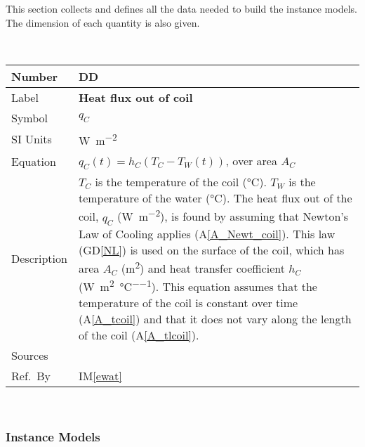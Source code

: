 \documentclass[12pt]{article}
\newcommand{\colAwidth}{0.13\textwidth}
\newcommand{\colBwidth}{0.82\textwidth}
\newcounter{defnum} %
\newcommand{\dref}[1]{GD\ref{#1}}
\newcounter{datadefnum} %
\newcommand{\aref}[1]{A\ref{#1}}
\newcommand{\iref}[1]{IM\ref{#1}}
\begin{document}
This section collects and defines all the data needed to build the instance
models. The dimension of each quantity is also given.  

~\newline

\noindent
\begin{minipage}{\textwidth}
	\renewcommand*{\arraystretch}{1.5}
	\begin{tabular}{| p{\colAwidth} | p{\colBwidth}|}
		\hline
		\rowcolor[gray]{0.9}
		Number& DD{datadefnum}\thedatadefnum \label{FluxCoil}\\
		\hline
		Label& \bf Heat flux out of coil\\
		\hline
		Symbol &$q_C$\\
		\hline
		  SI Units & \si{\watt\per\square\metre}\\
		  \hline
		  Equation&$q_C(t) = h_C (T_C - T_W(t))$, over area $A_C$\\
		  \hline
		  Description & 
		                $T_C$ is the temperature of the coil (\si{\celsius}).  $T_W$ is the temperature of the water (\si{\celsius}).  
		                The heat flux out of the coil, $q_C$ (\si{\watt\per\square\metre}), is found by
		                assuming that Newton's Law 
		                of Cooling applies (\aref{A_Newt_coil}).  This law (\dref{NL}) is used on the surface of
		                the coil, which has area $A_C$ (\si{\square\metre}) and heat 
		                transfer coefficient $h_C$
		                (\si{\watt\per\square\metre\per\celsius}).  This equation
		                assumes that the temperature of the coil is constant over time (\aref{A_tcoil}) and that it does not vary along the length
		                of the coil (\aref{A_tlcoil}).
		  \\
		  \hline
		  Sources&~\cite{Lightstone2012}  \\
		  \hline
		  Ref.\ By & \iref{ewat}\\
		  \hline
	\end{tabular}
\end{minipage}\\

\subsubsection{Instance Models} \label{sec_instance}    
\end{document}

